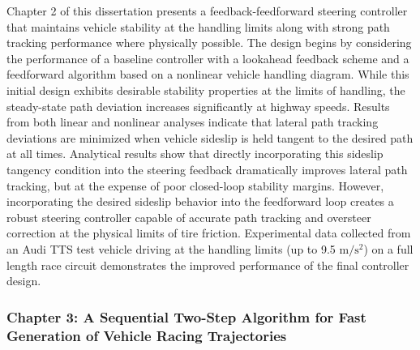 Chapter 2 of this dissertation presents a feedback-feedforward steering controller that maintains vehicle stability at the handling limits
along with strong path tracking performance where physically possible. The design begins by considering the performance of a baseline
controller with a lookahead feedback scheme and a feedforward algorithm based on a nonlinear vehicle handling diagram.
While this initial design exhibits desirable stability properties 
at the limits of handling, the steady-state path deviation increases significantly at highway speeds. 
Results from both linear and nonlinear analyses indicate that lateral path tracking deviations are minimized when vehicle sideslip 
is held tangent to the desired path at all times. Analytical results show that 
directly incorporating this sideslip tangency condition into the steering feedback dramatically improves lateral path tracking, 
but at the expense of poor closed-loop stability margins.  However, incorporating the desired sideslip behavior
into the feedforward loop creates a robust steering controller capable of accurate path 
tracking and oversteer correction at the physical limits of tire friction. Experimental data collected from an 
Audi TTS test vehicle driving at the handling limits (up to 9.5 $\mathrm{m/s^2}$) on a full length race circuit demonstrates the
 improved performance of the final controller design. 

\subsubsection{Chapter 3: A Sequential Two-Step Algorithm for Fast Generation of \newline Vehicle Racing Trajectories}
 \label{ch1FGbenefits}
  

